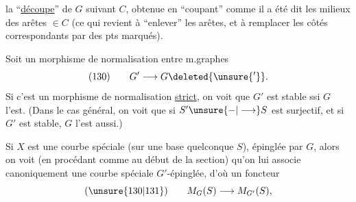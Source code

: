 la ``\uline{découpe}'' de $G$ suivant $C$, obtenue en ``coupant'' comme il a été dit  les milieux des arêtes $\in C$ (ce qui revient à ``enlever'' les arêtes, et à remplacer les côtés correspondants par des pts marqués).

Soit un morphisme de normalisation entre m.graphes
\[
(130)\qquad G'\longrightarrow G\deleted{\unsure{'}}.
\]
Si c'est un morphisme de normalisation \uline{strict}, on voit que $G'$ est stable ssi $G$ l'est. (Dans le cas général, on voit que si $S'\unsure{-|\longrightarrow}S$ est surjectif, et si $G'$ est stable, $G$ l'est aussi.)

 Si $X$ est une courbe spéciale (sur une base quelconque $S$), épinglée par $G$, alors on voit (en procédant comme au début de la section) qu'on lui associe canoniquement une courbe spéciale $G'$-épinglée, d'où un foncteur
\[
(\unsure{130|131})\qquad M_G(S)\longrightarrow M_{G'}(S),
\]
